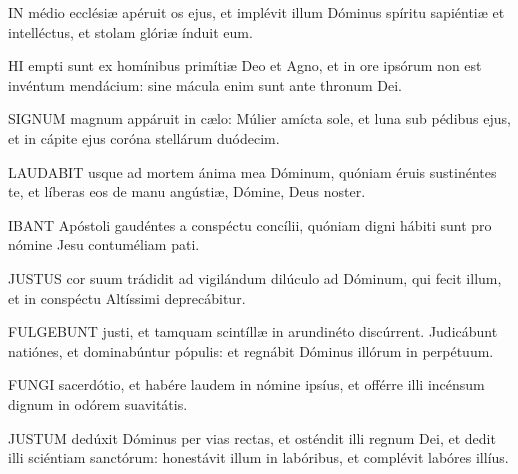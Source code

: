 
\lettrine[lines=2]{I}{N} médio ecclésiæ apéruit os ejus, et implévit illum Dóminus spíritu sapiéntiæ et intelléctus, et stolam glóriæ índuit eum.


\lettrine[lines=2]{H}{I} empti sunt ex homínibus primítiæ Deo et Agno, et in ore ipsórum non est invéntum mendácium: sine mácula enim sunt ante thronum Dei.



\lettrine[lines=2]{S}{IGNUM} magnum appáruit in cælo: Múlier amícta sole, et luna sub pédibus ejus, et in cápite ejus coróna stellárum duódecim.


\lettrine[lines=2]{L}{AUDABIT} usque ad mortem ánima mea Dóminum, quóniam éruis sustinéntes te, et líberas eos de manu angústiæ, Dómine, Deus noster.



\lettrine[lines=2]{I}{BANT} Apóstoli gaudéntes a conspéctu concílii, quóniam digni hábiti sunt pro nómine Jesu contuméliam pati.


\lettrine[lines=2]{J}{USTUS} cor suum trádidit ad vigilándum dilúculo ad Dóminum, qui fecit illum, et in conspéctu Altíssimi deprecábitur.


\lettrine[lines=2]{F}{ULGEBUNT} justi, et tamquam scintíllæ in arundinéto discúrrent. Judicábunt natiónes, et dominabúntur pópulis: et regnábit Dóminus illórum in perpétuum.


\lettrine[lines=2]{F}{UNGI} sacerdótio, et habére laudem in nómine ipsíus, et offérre illi incénsum dignum in odórem suavitátis.


\lettrine[lines=2]{J}{USTUM} dedúxit Dóminus per vias rectas, et osténdit illi regnum Dei, et dedit illi sciéntiam sanctórum: honestávit illum in labóribus, et complévit labóres illíus.


